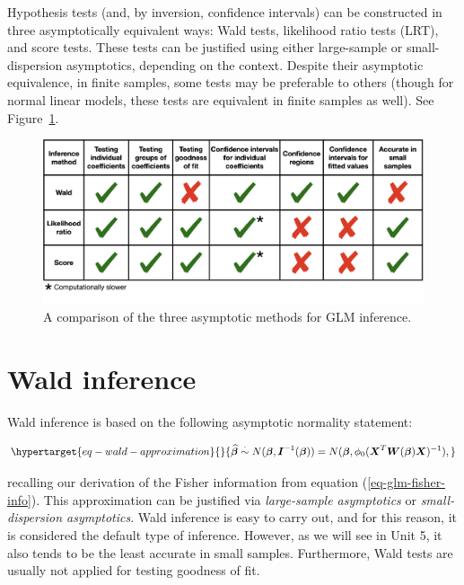 \documentclass[
  11pt,
  letterpaper,
  oneside]{book}
\theoremstyle{definition}
\theoremstyle{plain}
\theoremstyle{plain}
\theoremstyle{plain}
\theoremstyle{remark}
\begin{document}
Hypothesis tests (and, by inversion, confidence intervals) can be
constructed in three asymptotically equivalent ways: Wald tests,
likelihood ratio tests (LRT), and score tests. These tests can be
justified using either large-sample or small-dispersion asymptotics,
depending on the context. Despite their asymptotic equivalence, in
finite samples, some tests may be preferable to others (though for
normal linear models, these tests are equivalent in finite samples as
well). See Figure~\ref{fig-trinity-comparison}.

\begin{figure}

{\centering \includegraphics[width=1\textwidth,height=\textheight]{figures/trinity-comparison.png}

}

\caption{\label{fig-trinity-comparison}A comparison of the three
asymptotic methods for GLM inference.}

\end{figure}

\hypertarget{sec-wald-inference}{%
\section{Wald inference}\label{sec-wald-inference}}

Wald inference is based on the following asymptotic normality statement:

\begin{equation}\protect\hypertarget{eq-wald-approximation}{}{
\boldsymbol{\widehat \beta} \overset{\cdot}{\sim} N(\boldsymbol{\beta}, \boldsymbol{I}^{-1}(\boldsymbol{\beta})) = N(\boldsymbol{\beta}, \phi_0(\boldsymbol{X}^T \boldsymbol{W}(\boldsymbol{\beta}) \boldsymbol{X})^{-1}),
}\label{eq-wald-approximation}\end{equation}

recalling our derivation of the Fisher information from equation
(\ref{eq-glm-fisher-info}). This approximation can be justified via
\emph{large-sample asymptotics} or \emph{small-dispersion asymptotics}.
Wald inference is easy to carry out, and for this reason, it is
considered the default type of inference. However, as we will see in
Unit 5, it also tends to be the least accurate in small samples.
Furthermore, Wald tests are usually not applied for testing goodness of
fit.
\end{document}
